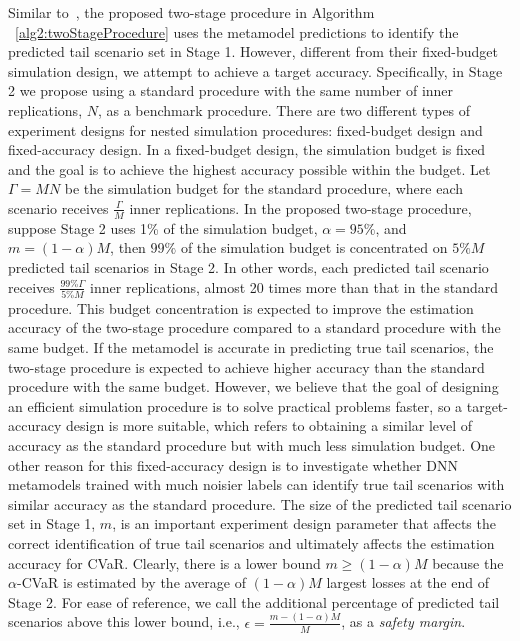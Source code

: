 Similar to~\cite{dang2020efficient}, the proposed two-stage procedure in Algorithm ~\ref{alg2:twoStageProcedure} uses the metamodel predictions to identify the predicted tail scenario set in Stage 1.
However, different from their fixed-budget simulation design, we attempt to achieve a target accuracy.
Specifically, in Stage 2 we propose using a standard procedure with the same number of inner replications, $N$, as a benchmark procedure.
There are two different types of experiment designs for nested simulation procedures: fixed-budget design and fixed-accuracy design.
In a fixed-budget design, the simulation budget is fixed and the goal is to achieve the highest accuracy possible within the budget.
Let $\Gamma = MN$ be the simulation budget for the standard procedure, where each scenario receives $\frac{\Gamma}{M}$ inner replications.
In the proposed two-stage procedure, suppose Stage 2 uses 1\% of the simulation budget, $\alpha = 95\%$, and $m=(1-\alpha)M$, then $99\%$ of the simulation budget is concentrated on $5\% M$ predicted tail scenarios in Stage 2.
In other words, each predicted tail scenario receives $\frac{99\% \Gamma}{5\% M}$ inner replications, almost 20 times more than that in the standard procedure.
This budget concentration is expected to improve the estimation accuracy of the two-stage procedure compared to a standard procedure with the same budget. 
If the metamodel is accurate in predicting true tail scenarios, the two-stage procedure is expected to achieve higher accuracy than the standard procedure with the same budget.
However, we believe that the goal of designing an efficient simulation procedure is to solve practical problems faster, so a target-accuracy design is more suitable, which refers to obtaining a similar level of accuracy as the standard procedure but with much less simulation budget.
One other reason for this fixed-accuracy design is to investigate whether DNN metamodels trained with much noisier labels can identify true tail scenarios with similar accuracy as the standard procedure.
The size of the predicted tail scenario set in Stage 1, $m$, is an important experiment design parameter that affects the correct identification of true tail scenarios and ultimately affects the estimation accuracy for CVaR.
Clearly, there is a lower bound $m \geq (1-\alpha)M$ because the $\alpha$-CVaR is estimated by the average of $(1-\alpha)M$ largest losses at the end of Stage 2.
For ease of reference, we call the additional percentage of predicted tail scenarios above this lower bound, i.e., $\epsilon = \frac{m - (1-\alpha)M}{M}$, as a \textit{safety margin}.
